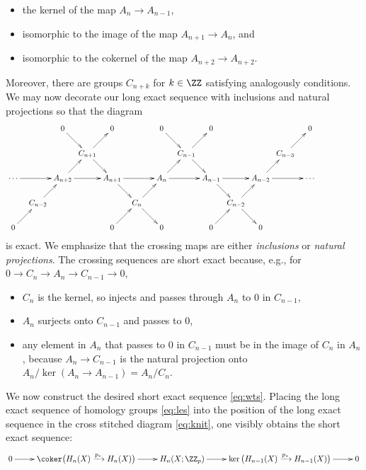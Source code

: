 \documentclass[10pt]{amsart}
\providecommand{\tightlist}{%
  \setlength{\itemsep}{0pt}\setlength{\parskip}{0pt}}
\begin{document}
\begin{itemize}
\tightlist
\item
  the kernel of the map \(A_n \to A_{n-1}\),
\item
  isomorphic to the image of the map \(A_{n+1} \to A_n\), and
\item
  isomorphic to the cokernel of the map \(A_{n+2} \to A_{n+2}\).
\end{itemize}

Moreover, there are groups \(C_{n+k}\) for \(k \in \ZZ\) satisfying
analogously conditions. We may now decorate our long exact sequence with
inclusions and natural projections so that the diagram \begin{equation}
\xymatrix @=2pt@! { %
&&0\ar[dr]&&0&&0\ar[dr]&&0&&&&0\\
&&&C_{n+1}\ar[ur]\ar[dr]&&&&C_{n-1}\ar[ur]\ar[dr]&&&&C_{n-3}\ar[ur]\\
\cdots \ar[rr]&&A_{n+2}\ar[rr]\ar[ur]&&A_{n+1}\ar[rr]\ar[dr]&&A_{n}\ar[rr]\ar[ur]&&A_{n-1}\ar[rr]\ar[dr]&&A_{n-2}\ar[ur]\ar[rr]&&\cdots\\
&C_{n-2}\ar[ur]&&&&C_{n}\ar[ur]\ar[dr]&&&&C_{n-2}\ar[ur]\ar[dr]&&&&\\
0\ar[ur]&&&&0\ar[ur]&&0&&0\ar[ur]&&0&&&&
}
\label{eq:knit}
\end{equation} is exact. We emphasize that the crossing maps are either
\emph{inclusions} or \emph{natural projections}. The crossing sequences
are short exact because, e.g., for
\(0 \to C_n \to A_n \to C_{n-1} \to 0\),

\begin{itemize}
\tightlist
\item
  \(C_n\) is the kernel, so injects and passes through \(A_n\) to \(0\)
  in \(C_{n-1}\),
\item
  \(A_n\) surjects onto \(C_{n-1}\) and passes to \(0\),
\item
  any element in \(A_n\) that passes to \(0\) in \(C_{n-1}\) must be in
  the image of \(C_n\) in \(A_n\), because \(A_n \to C_{n-1}\) is the
  natural projection onto \(A_n / \ker(A_n \to A_{n-1}) = A_n /C_n\).
\end{itemize}

We now construct the desired short exact sequence \eqref{eq:wts}.
Placing the long exact sequence of homology groups \eqref{eq:les} into
the position of the long exact sequence in the cross stitched diagram
\eqref{eq:knit}, one visibly obtains the short exact sequence:
\begin{equation}
\xymatrix{
0 \ar[r] & \coker\big(H_n(X) \xrightarrow{p_*} H_n(X)\big) \ar[r]  & H_n(X; \ZZ_p) \ar[r] & \ker\big( H_{n-1}(X) \xrightarrow{p_*} H_{n-1}(X)\big) \ar[r] & 0
}
\label{eq:sestosplit}
\end{equation}
\end{document}
